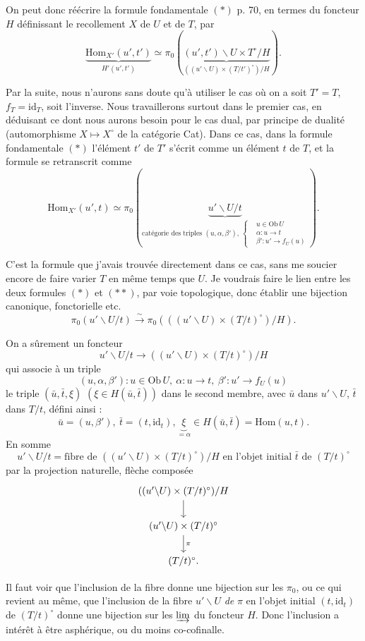 \documentclass[11pt]{article}
\newcommand{\printedpage}[1]{\marginpar{\footnotesize p.~#1}}
\newcommand{\msp}[1]{\marginpar{\footnotesize [#1]}}
\newcommand{\Hom}{\mathrm{Hom}}
\newcommand{\id}{\mathrm{id}}
\newcommand{\Ob}{\mathrm{Ob}\,}
\begin{document}
\msp{page 72} On peut donc réécrire la formule fondamentale $(*)$ p. 70, en termes du foncteur $H$ définissant le recollement $X$ de $U$ et de $T$, par
\[
\boxed{\underbrace{\Hom_{X'}(u',t')}_{H'(u',t')} \simeq \pi_0(\underbrace{(u',t')\backslash U\times T^{\circ}/H}_{((u'\backslash U)\times(T/t')^{\circ})/H}).}
\tag*{$(*)$}
\]

Par la suite, nous n'aurons sans doute qu'à utiliser le cas où on a soit $T'=T$, $f_T=\id_T$, soit l'inverse. Nous travaillerons surtout dans le premier cas, en déduisant ce dont nous aurons besoin pour le cas dual, par principe de dualité (automorphisme $X\longmapsto X^{\circ}$ de la
\printedpage{52}
catégorie Cat). Dans ce cas, dans la formule fondamentale $(*)$ l'élément $t'$ de $T'$ s'écrit comme un élément $t$ de $T$, et la formule se retranscrit comme
\[
\boxed{\Hom_{X'}(u',t) \simeq \pi_0(\underbrace{u'\backslash U/t}_{\text{catégorie des triples } (u,\alpha,\beta'),\ \left\{\begin{aligned} &u\in \Ob U\\ &\alpha : u\longrightarrow t\\ &\beta' : u'\longrightarrow f_U(u)\end{aligned}\right.}).}
\tag*{$(**)$}
\]

C'est la formule que j'avais trouvée directement dans ce cas, sans me soucier encore de faire varier $T$ en même temps que $U$. Je voudrais faire le lien entre les deux formules $(*)$ et $(**)$, par voie topologique, donc établir une bijection canonique, fonctorielle etc.
\[
\pi_0(u'\backslash U/t) \xrightarrow{\sim} \pi_0(((u'\backslash U)\times(T/t)^{\circ})/H).
\]

\msp{page 73} On a sûrement un foncteur
\[
u'\backslash U/t \longrightarrow ((u'\backslash U)\times(T/t)^{\circ})/H
\]
qui associe à un triple
\[
(u,\alpha,\beta') : u\in \Ob U,\ \alpha : u\longrightarrow t,\ \beta' : u'\longrightarrow f_U(u)
\]
le triple $(\bar u,\bar t,\xi)$ $(\xi\in H(\bar u,\bar t))$ dans le second membre, avec $\bar u$ dans $u'\backslash U$, $\bar t$ dans $T/t$, défini ainsi :
\[
\bar u = (u,\beta'),\ \bar t = (t,\id_t), \underbrace{\xi}_{=\alpha} \in H(\bar u,\bar t) = \Hom(u,t).
\]
En somme
\[
u'\backslash U/t = \text{fibre de } ((u'\backslash U)\times(T/t)^{\circ})/H \text{ en l'objet initial } \bar t \text{ de } (T/t)^{\circ}
\]
par la projection naturelle, flèche composée
\[
\begin{tikzcd}
((u'\backslash U)\times(T/t)^{\circ})/H \arrow[d] \\
(u'\backslash U)\times(T/t)^{\circ} \arrow[d, "\pi"] \\
(T/t)^{\circ}.
\end{tikzcd}
\]

Il faut voir que l'inclusion de la fibre donne une bijection sur les $\pi_0$, ou ce qui revient au même, que l'inclusion de la fibre $u'\backslash U$ \textit{de} $\pi$ en l'objet initial $(t,\id_t)$ de $(T/t)^{\circ}$ donne une bijection sur les $\varinjlim$ du foncteur $H$. Donc l'inclusion a intérêt à être asphérique, ou du moins co-cofinalle. %
\end{document}
